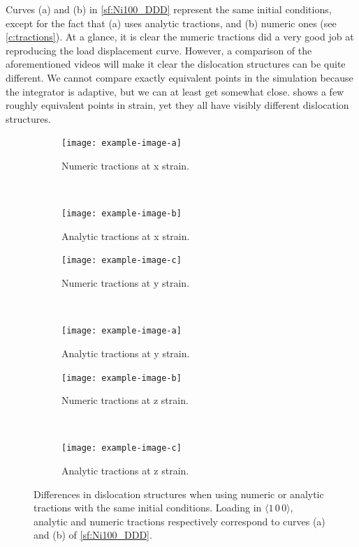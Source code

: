 Curves (a) and (b) in \cref{sf:Ni100_DDD} represent the same initial conditions, except for the fact that (a) uses analytic tractions, and (b) numeric ones (see \cref{c:tractions}). At a glance, it is clear the numeric tractions did a very good job at reproducing the load displacement curve. However, a comparison of the aforementioned videos will make it clear the dislocation structures can be quite different. We cannot compare exactly equivalent points in the simulation because the integrator is adaptive, but we can at least get somewhat close.  shows a few roughly equivalent points in strain, yet they all have visibly different dislocation structures.
\begin{figure}
    \centering
    \begin{subfigure}[t]{0.45\linewidth}
        \centering
        \texttt{[image: example-image-a]}
        \caption{Numeric tractions at x strain.}
    \end{subfigure}
    ~
    \begin{subfigure}[t]{0.45\linewidth}
        \centering
        \texttt{[image: example-image-b]}
        \caption{Analytic tractions at x strain.}
    \end{subfigure}

    \begin{subfigure}[t]{0.45\linewidth}
        \centering
        \texttt{[image: example-image-c]}
        \caption{Numeric tractions at y strain.}
    \end{subfigure}
    ~
    \begin{subfigure}[t]{0.45\linewidth}
        \centering
        \texttt{[image: example-image-a]}
        \caption{Analytic tractions at y strain.}
    \end{subfigure}

    \begin{subfigure}[t]{0.45\linewidth}
        \centering
        \texttt{[image: example-image-b]}
        \caption{Numeric tractions at z strain.}
    \end{subfigure}
    ~
    \begin{subfigure}[t]{0.45\linewidth}
        \centering
        \texttt{[image: example-image-c]}
        \caption{Analytic tractions at z strain.}
    \end{subfigure}
    \caption[Differences in dislocation structures when using numeric or analytic tractions with the same initial conditions.]{Differences in dislocation structures when using numeric or analytic tractions with the same initial conditions. Loading in $\langle 1\, 0\, 0 \rangle$, analytic and numeric tractions respectively correspond to curves (a) and (b) of \cref{sf:Ni100_DDD}.}
    \label{f:analyticNumericStruct}
\end{figure}

